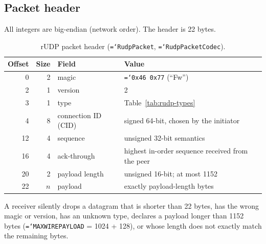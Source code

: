 \documentclass[11pt,a4paper]{article}
\newcommand{\code}[1]{\texttt{\hyphenchar\font=`\-\relax #1}}
\DeclareRobustCommand{\_}{\origunderscore\allowbreak}
\begin{document}
\subsection{Packet header}
All integers are big-endian (network order). The header is 22 bytes.

\begin{table}[ht]
\centering\small
\begin{tabular}{rrll}
\toprule
Offset & Size & Field & Value\\
\midrule
0 & 2 & magic & \code{0x46 0x77} (``Fw'')\\
2 & 1 & version & 2\\
3 & 1 & type & Table~\ref{tab:rudp-types}\\
4 & 8 & connection ID (CID) & signed 64-bit, chosen by the initiator\\
12 & 4 & sequence & unsigned 32-bit semantics\\
16 & 4 & ack-through & highest in-order sequence received from the peer\\
20 & 2 & payload length & unsigned 16-bit; at most 1152\\
22 & $n$ & payload & exactly payload-length bytes\\
\bottomrule
\end{tabular}
\caption{rUDP packet header (\code{RudpPacket}, \code{RudpPacketCodec}).}
\label{tab:rudp-header}
\end{table}

A receiver silently drops a datagram that is shorter than 22 bytes, has the wrong magic or
version, has an unknown type, declares a payload longer than 1152 bytes
(\code{MAX\_WIRE\_PAYLOAD} = 1024 + 128), or whose length does not exactly match the remaining
bytes.
\end{document}
